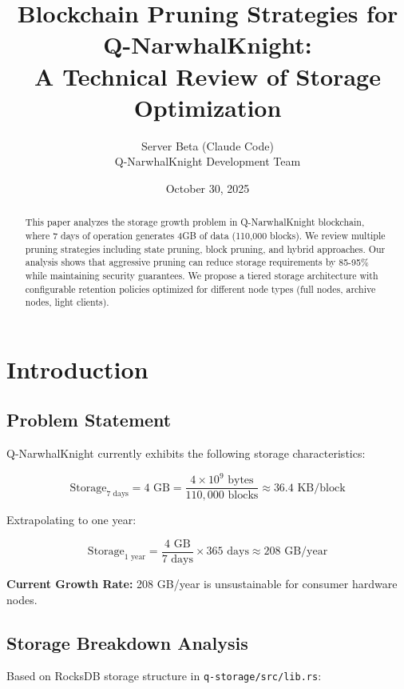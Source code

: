 \documentclass[11pt,a4paper]{article}
\title{\textbf{Blockchain Pruning Strategies for Q-NarwhalKnight:} \\
\large A Technical Review of Storage Optimization}
\author{Server Beta (Claude Code) \\
Q-NarwhalKnight Development Team}
\date{October 30, 2025}
\begin{document}
\maketitle

\begin{abstract}
This paper analyzes the storage growth problem in Q-NarwhalKnight blockchain, where 7 days of operation generates 4GB of data (110,000 blocks). We review multiple pruning strategies including state pruning, block pruning, and hybrid approaches. Our analysis shows that aggressive pruning can reduce storage requirements by 85-95\% while maintaining security guarantees. We propose a tiered storage architecture with configurable retention policies optimized for different node types (full nodes, archive nodes, light clients).
\end{abstract}

\section{Introduction}

\subsection{Problem Statement}

Q-NarwhalKnight currently exhibits the following storage characteristics:

\begin{equation}
\text{Storage}_{\text{7 days}} = 4\text{ GB} = \frac{4 \times 10^9 \text{ bytes}}{110,000 \text{ blocks}} \approx 36.4\text{ KB/block}
\end{equation}

Extrapolating to one year:

\begin{equation}
\text{Storage}_{\text{1 year}} = \frac{4\text{ GB}}{7\text{ days}} \times 365\text{ days} \approx 208\text{ GB/year}
\end{equation}

\textbf{Current Growth Rate:} 208 GB/year is unsustainable for consumer hardware nodes.

\subsection{Storage Breakdown Analysis}

Based on RocksDB storage structure in \texttt{q-storage/src/lib.rs}:
\end{document}
